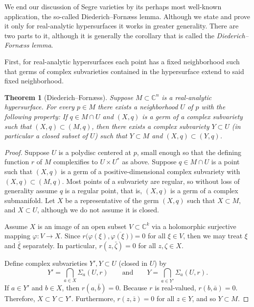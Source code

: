 \documentclass[12pt,openany]{book}
\newcommand{\C}{{\mathbb{C}}}
\newcommand{\myindex}[1]{#1\index{#1}}
\theoremstyle{plain}
\newtheorem{thm}{Theorem}[section]
\theoremstyle{remark}
\theoremstyle{definition}
\theoremstyle{exercise}
\theoremstyle{example}
\begin{document}
We end our discussion of Segre varieties by its perhaps most well-known
application, the so-called Diederich--Forn\ae ss lemma.  Although
we state and prove it only for real-analytic hypersurfaces it works in greater generality.
There are two parts to it, although it is generally the corollary
that is called the \emph{\myindex{Diederich--Forn\ae ss lemma}}.

First, for real-analytic hypersurfaces each point has a fixed neighborhood
such that germs of complex subvarieties contained in the hypersurface extend
to said fixed neighborhood.

\begin{thm}[Diederich--Forn\ae ss]
\pagebreak[2]
Suppose $M \subset \C^n$ is a real-analytic hypersurface.  For every
$p \in M$ there exists a neighborhood $U$ of $p$ with the following
property:
If $q \in M \cap U$ and
$(X,q)$ is a germ of a complex subvariety
such that $(X,q) \subset (M,q)$,
then there exists a complex subvariety $Y \subset U$ (in
particular a closed subset of $U$) such that $Y \subset M$ and $(X,q)
\subset (Y,q)$.
\end{thm}

\begin{proof}
Suppose $U$ is a polydisc centered at $p$,
small enough so that the defining function
$r$ of $M$ complexifies to $U \times U^*$ as above.
Suppose $q \in M \cap U$ is a point such that $(X,q)$ is a germ of a
positive-dimensional complex subvariety with $(X,q) \subset (M,q)$.
Most points of a subvariety are regular, so
without loss of generality assume $q$ is a regular point, that is,
$(X,q)$ is a germ of a complex submanifold.
Let $X$ be a representative of the germ $(X,q)$ such that $X \subset M$,
and $X \subset U$, although we do not assume it is closed.

Assume $X$ is an
image of an open subset $V \subset \C^k$ via a holomorphic surjective mapping $\varphi \colon V \to
X$.  Since $r\bigl(\varphi(\xi),\overline{\varphi(\xi)}\bigr) = 0$
for all $\xi \in V$, then we may treat $\xi$ and $\bar{\xi}$ separately.
In particular,
$r(z,\bar{\zeta}) = 0$ for all $z,\zeta \in X$.

Define complex subvarieties $Y', Y \subset U$ (closed in $U$) by
\begin{equation*}
Y' = \bigcap_{a \in X} \Sigma_a(U,r)
\qquad \text{and} \qquad
Y = \bigcap_{a \in Y'} \Sigma_a(U,r) .
\end{equation*}
If $a \in Y'$ and $b \in X$, then $r(a,\bar{b}) = 0$.
Because $r$ is real-valued,
$r(b,\bar{a}) = 0$.  Therefore,
$X \subset Y \subset Y'$.  Furthermore, $r(z,\bar{z}) = 0$
for all $z \in Y$, and so $Y \subset M$.
\end{proof}
\end{document}
